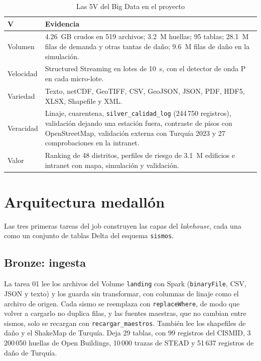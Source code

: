 \documentclass[conference]{IEEEtran}%
\begin{document}
\begin{table}[H]
\centering
\caption{Las 5V del Big Data en el proyecto}
\label{tab:5v}
\footnotesize
\renewcommand{\arraystretch}{1.12}
\begin{tabularx}{\columnwidth}{>{\raggedright\arraybackslash}p{1.45cm} Y}
\toprule
\textbf{V} & \textbf{Evidencia} \\
\midrule
Volumen & 4.26~GB crudos en 519 archivos; 3.2~M huellas; 95 tablas; 28.1~M filas de demanda y otras tantas de daño; 9.6~M filas de daño en la simulación. \\
Velocidad & Structured Streaming en lotes de 10~s, con el detector de onda P en cada micro-lote. \\
Variedad & Texto, netCDF, GeoTIFF, CSV, GeoJSON, JSON, PDF, HDF5, XLSX, Shapefile y XML. \\
Veracidad & Linaje, cuarentena, \texttt{silver\_calidad\_log} (244\,750 registros), validación dejando una estación fuera, contraste de pisos con OpenStreetMap, validación externa con Turquía 2023 y 27 comprobaciones en la intranet. \\
Valor & Ranking de 48 distritos, perfiles de riesgo de 3.1~M edificios e intranet con mapa, simulación y validación. \\
\bottomrule
\end{tabularx}
\end{table}

\section{Arquitectura medallón}\label{sec:medallon}
Las tres primeras tareas del job construyen las capas del \emph{lakehouse}, cada una como un conjunto de tablas Delta del esquema \texttt{sismos}.

\subsection{Bronze: ingesta}
La tarea 01 lee los archivos del Volume \texttt{landing} con Spark (\texttt{binaryFile}, CSV, JSON y texto) y los guarda sin transformar, con columnas de linaje como el archivo de origen. Cada sismo se reemplaza con \texttt{replaceWhere}, de modo que volver a cargarlo no duplica filas, y las fuentes maestras, que no cambian entre sismos, solo se recargan con \texttt{recargar\_maestros}. También lee los shapefiles de daño y el ShakeMap de Turquía. Deja 29 tablas, con 99 registros del CISMID, 3\,200\,050 huellas de Open Buildings, 10\,000 trazas de STEAD y 51\,637 registros de daño de Turquía.
\end{document}
